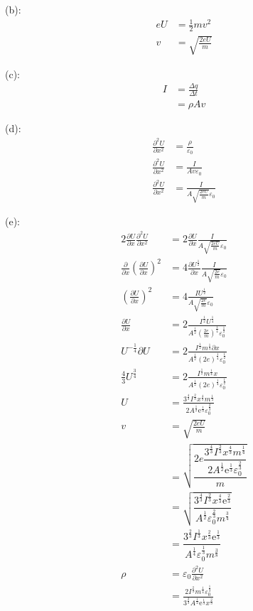 (b):
\begin{align*}
    eU&=\frac{1}{2}mv^2\\
    v&=\sqrt{\frac{2eU}{m}}
\end{align*}

(c):
\begin{align*}
    I&=\frac{\Delta q}{\Delta t}\\
    &=\rho A v
\end{align*}

(d):
\begin{align*}
    \frac{\partial^2 U}{\partial x^2}&=\frac{\rho}{\varepsilon_0}\\
    \frac{\partial^2 U}{\partial x^2}&=\frac{I}{Av\varepsilon_0}\\
    \frac{\partial^2 U}{\partial x^2}&=\frac{I}{A\sqrt{\frac{2eU}{m}}\varepsilon_0}
    \end{align*}

    (e):
    \begin{align*}
    2\frac{\partial U}{\partial x}\frac{\partial^2 U}{\partial x^2}&=2\frac{\partial U}{\partial x}\frac{I}{A\sqrt{\frac{2eU}{m}}\varepsilon_0}\\
    \frac{\partial }{\partial x}\left(\frac{\partial U}{\partial x}\right)^2&=4\frac{\partial U^\frac{1}{2}}{\partial x}\frac{I}{A\sqrt{\frac{2e}{m}}\varepsilon_0}\\
    \left(\frac{\partial U}{\partial x}\right)^2&=4\frac{IU^\frac{1}{2}}{A\sqrt{\frac{2e}{m}}\varepsilon_0}\\
    \frac{\partial U}{\partial x}&=2\frac{I^\frac{1}{2}U^\frac{1}{4}}{A^\frac{1}{2}\left(\frac{2e}{m}\right)^\frac{1}{4}\varepsilon_0^\frac{1}{2}}\\
    U^{-\frac{1}{4}}{\partial U}{}&=2\frac{I^\frac{1}{2}{m}^\frac{1}{4}\partial x}{A^\frac{1}{2}(2e)^\frac{1}{4}\varepsilon_0^\frac{1}{2}}\\
    \frac{4}{3}U^{\frac{3}{4}}&=2\frac{I^\frac{1}{2}{m}^\frac{1}{4}x}{A^\frac{1}{2}(2e)^\frac{1}{4}\varepsilon_0^\frac{1}{2}}\\
    U&=\frac{3^{\frac{4}{3}}I^\frac{2}{3}x^{\frac{4}{3}}{m}^\frac{1}{4}}{2A^\frac{1}{2}\mathrm{e}^\frac{1}{3}\varepsilon_0^\frac{2}{3}}\\
    v&=\sqrt{\frac{2eU}{m}}\\
    &=\sqrt{\dfrac{2e\dfrac{3^{\frac{4}{3}}I^\frac{2}{3}x^{\frac{4}{3}}{m}^\frac{1}{4}}{2A^\frac{1}{2}\mathrm{e}^\frac{1}{3}\varepsilon_0^\frac{2}{3}}}{m}}\\
    &=\sqrt{\dfrac{3^{\frac{4}{3}}I^\frac{2}{3}x^{\frac{4}{3}}\mathrm{e}^\frac{2}{3}}{A^\frac{1}{2}\varepsilon_0^\frac{2}{3}{m}^\frac{3}{4}}}\\
    &=\dfrac{3^{\frac{2}{3}}I^\frac{1}{3}x^{\frac{2}{3}}\mathrm{e}^\frac{1}{3}}{A^\frac{1}{4}\varepsilon_0^\frac{1}{3}{m}^\frac{3}{8}}\\
    \rho&=\varepsilon_0\frac{\partial^2 U}{\partial x^2}\\
    &=\frac{2I^\frac{2}{3}{m}^\frac{1}{4}\varepsilon_0^\frac{1}{3}}{3^{\frac{2}{3}}A^\frac{1}{2}\mathrm{e}^\frac{1}{3}x^{\frac{2}{3}}}
\end{align*}

